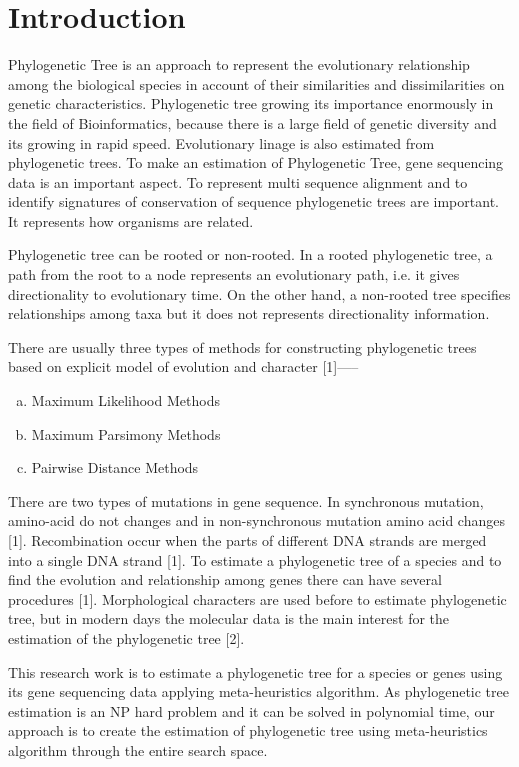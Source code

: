 \documentclass[preprint,12pt]{elsarticle}
\begin{document}


\section{Introduction}
\label{S:1}

Phylogenetic Tree is an approach to represent the evolutionary relationship among the biological species in account of their similarities and dissimilarities on genetic characteristics. Phylogenetic tree growing its importance enormously in the field of Bioinformatics, because there is a large field of genetic diversity and its growing in rapid speed. Evolutionary linage is also estimated from phylogenetic trees. To make an estimation of Phylogenetic Tree, gene sequencing data is an important aspect. To represent multi sequence alignment and to identify signatures of conservation of sequence phylogenetic trees are important. It represents how organisms are related. 


Phylogenetic tree can be rooted or non-rooted. In a rooted phylogenetic tree, a path from the root to a node represents an evolutionary path, i.e. it gives directionality to evolutionary time. On the other hand, a non-rooted tree specifies relationships among taxa but it does not represents directionality information. 


There are usually three types of methods for constructing phylogenetic trees based on explicit model of evolution and character [1]—--
\begin{enumerate}[a)] %
	\item Maximum Likelihood Methods
    \item Maximum Parsimony Methods 
    \item Pairwise Distance Methods
\end{enumerate}


There are two types of mutations in gene sequence. In synchronous mutation, amino-acid do not changes and in non-synchronous mutation amino acid changes [1]. Recombination occur when the parts of different DNA strands are merged into a single DNA strand [1]. To estimate a phylogenetic tree of a species and to find the evolution and relationship among genes there can have several procedures [1]. Morphological characters are used before to estimate phylogenetic tree, but in modern days the molecular data is the main interest for the estimation of the phylogenetic tree [2].


This research work is to estimate a phylogenetic tree for a species or genes using its gene sequencing data applying meta-heuristics algorithm. As phylogenetic tree estimation is an NP hard problem and it can be solved in polynomial time, our approach is to create the estimation of phylogenetic tree using meta-heuristics algorithm through the entire search space.
\end{document}
